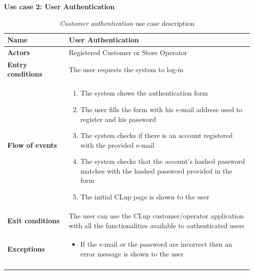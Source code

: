 \clearpage
\textbf{Use case 2: User Authentication}
\smallskip
{}
\begin{longtable}{p{0.25\linewidth}p{0.75\linewidth}}
    \toprule
    \textbf{Name}             & \textbf{User Authentication}                                                                                            \\
    \midrule
    \textbf{Actors}           & Registered Customer or Store Operator                                                                                   \\
    \midrule
    \textbf{Entry conditions} & The user requests the system to log-in                                                                                  \\
    \midrule
    \textbf{Flow of events}   &
    \begin{enumerate}
        \item The system shows the authentication form
        \item The user fills the form with his e-mail address used to register and his password
        \item The system checks if there is an account registered with the provided e-mail
        \item The system checks that the account's hashed password matches with the hashed password provided in the form
        \item The initial CLup page is shown to the user
    \end{enumerate}                                                                                                                           \\
    \midrule
    \textbf{Exit conditions}  & The user can use the CLup customer/operator application with all the functionalities available to authenticated users \\
    \midrule
    \textbf{Exceptions}       &
    \begin{itemize}
        \item If the e-mail or the password are incorrect then an error message is shown to the user
    \end{itemize}                                                                                                                           \\
    \bottomrule
    \caption{\emph{Customer authentication} use case description}
\end{longtable}


